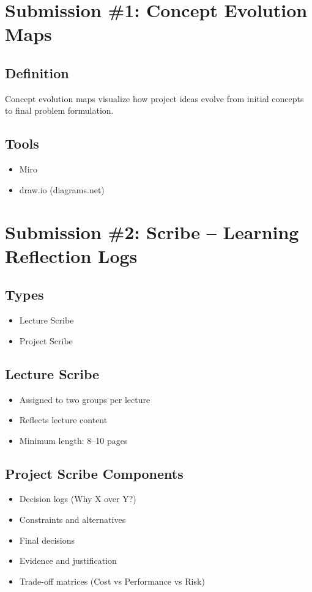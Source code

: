 \documentclass[12pt]{article}
\begin{document}
\section{Submission \#1: Concept Evolution Maps}

\subsection{Definition}
Concept evolution maps visualize how project ideas evolve from initial concepts to final problem formulation.

\subsection{Tools}
\begin{itemize}
    \item Miro
    \item draw.io (diagrams.net)
\end{itemize}

\section{Submission \#2: Scribe -- Learning Reflection Logs}

\subsection{Types}
\begin{itemize}
    \item Lecture Scribe
    \item Project Scribe
\end{itemize}

\subsection{Lecture Scribe}
\begin{itemize}
    \item Assigned to two groups per lecture
    \item Reflects lecture content
    \item Minimum length: 8--10 pages
\end{itemize}

\subsection{Project Scribe Components}
\begin{itemize}
    \item Decision logs (Why X over Y?)
    \item Constraints and alternatives
    \item Final decisions
    \item Evidence and justification
    \item Trade-off matrices (Cost vs Performance vs Risk)
\end{itemize}
\end{document}
